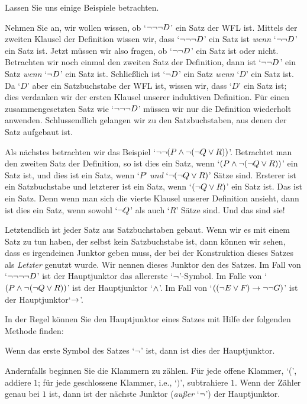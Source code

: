 Lassen Sie uns einige Beispiele betrachten.

Nehmen Sie an, wir wollen wissen, ob `$\neg \neg \neg D$' ein Satz der WFL ist. Mittels der zweiten Klausel der Definition wissen wir, dass `$\neg \neg \neg D$' ein Satz ist \emph{wenn} `$\neg \neg D$' ein Satz ist. Jetzt müssen wir also fragen, ob `$\neg \neg D$' ein Satz ist oder nicht. Betrachten wir noch einmal den zweiten Satz der Definition, dann ist `$\neg \neg D$' ein Satz \emph{wenn} `$\neg D$' ein Satz ist. Schlie{\ss}lich ist `$\neg D$' ein Satz \emph{wenn} `$D$' ein Satz ist. Da `$D$' aber ein Satzbuchstabe der WFL ist, wissen wir, dass `$D$' ein Satz ist; dies verdanken wir der ersten Klausel unserer induktiven Definition. Für einen zusammengesetzten Satz wie `$\neg \neg \neg D$' müssen wir nur die Definition wiederholt anwenden. Schlussendlich gelangen wir zu den Satzbuchstaben, aus denen der Satz aufgebaut ist.

Als nächstes betrachten wir das Beispiel `$\neg \neg (P \wedge \neg (\neg Q \vee R))$'. Betrachtet man den zweiten Satz der Definition, so ist dies ein Satz, wenn `$(P \wedge \neg (\neg Q \vee R))$' ein Satz ist, und dies ist ein Satz, wenn `$P$' \emph{und} `$\neg (\neg Q \vee R)$' Sätze sind. Ersterer ist ein Satzbuchstabe und letzterer ist ein Satz, wenn `$(\neg Q \vee R)$' ein Satz ist. Das ist ein Satz. Denn wenn man sich die vierte Klausel unserer Definition ansieht, dann ist dies ein Satz, wenn sowohl `$\neg Q$' als auch `$R$' Sätze sind. Und das sind sie!

Letztendlich ist jeder Satz aus Satzbuchstaben gebaut. Wenn wir es mit einem Satz zu tun haben, der selbst kein Satzbuchstabe ist, dann können wir sehen, dass es irgendeinen Junktor geben muss, der bei der Konstruktion dieses Satzes als \emph{Letzter} genutzt wurde. Wir nennen dieses Junktor den  des Satzes. Im Fall von `$\neg\neg\neg\neg D$' ist der Hauptjunktor das allererste `$\neg$'-Symbol. Im Falle von `$(P \wedge \neg (\neg Q \vee R))$' ist der Hauptjunktor `$\wedge$'. Im Fall von `$((\neg E \vee F) \rightarrow \neg \neg G)$' ist der Hauptjunktor`$\rightarrow$'.

In der Regel können Sie den Hauptjunktor eines Satzes mit Hilfe der folgenden Methode finden:
\begin{ebullet}
	\item Wenn das erste Symbol des Satzes `$\neg$' ist, dann ist dies der Hauptjunktor.
	\item Andernfalls beginnen Sie die Klammern zu zählen. Für jede offene Klammer, `(', addiere $1$; für jede geschlossene Klammer, i.e., `$)$', subtrahiere $1$. Wenn der Zähler genau bei $1$ ist, dann ist der nächste Junktor (\emph{au{\ss}er} `$\neg$') der Hauptjunktor.
\end{ebullet}

